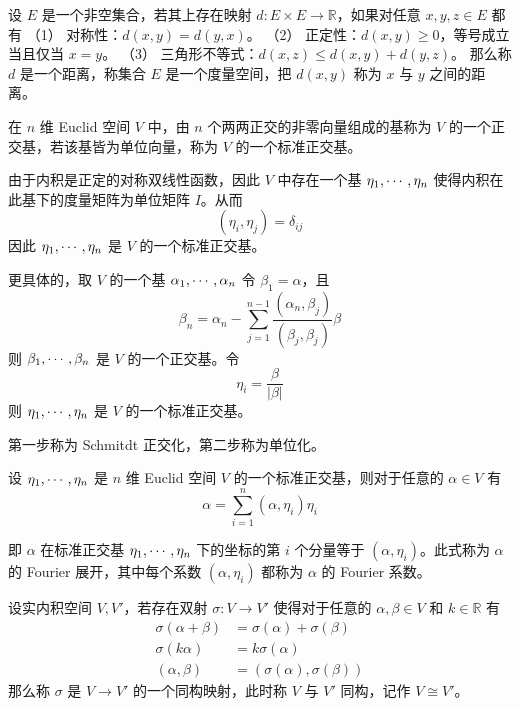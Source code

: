 \begin{definition}
	设 $E$ 是一个非空集合，若其上存在映射 $d : E \times E \to \mathbb{R}$，如果对任意 $x,y,z\in E$ 都有
	（1） 对称性：$d(x,y) = d(y,x)$。
	（2） 正定性：$d(x,y) \geqslant $0，等号成立当且仅当 $x = y$。
	（3） 三角形不等式：$d(x,z) \leqslant d(x,y) + d(y,z)$。
	那么称 $d$ 是一个距离，称集合 $E$ 是一个度量空间，把 $d(x,y)$ 称为 $x$ 与 $y$ 之间的距离。
\end{definition}

\begin{definition}
	在 $n$ 维 Euclid 空间 $V$ 中，由 $n$ 个两两正交的非零向量组成的基称为 $V$ 的一个正交基，若该基皆为单位向量，称为 $V$ 的一个标准正交基。
\end{definition}

由于内积是正定的对称双线性函数，因此 $V$ 中存在一个基 $\eta_1,\cdots,\eta_n$ 使得内积在此基下的度量矩阵为单位矩阵 $I$。从而
\[ (\eta_i,\eta_j) = \delta_{ij} \]
因此 $\eta_1,\cdots,\eta_n$ 是 $V$ 的一个标准正交基。

更具体的，取 $V$ 的一个基 $\alpha_1,\cdots,\alpha_n$ 令 $\beta_1 = \alpha$，且
\[ \beta_n = \alpha_n - \sum_{j=1}^{n-1} \frac{(\alpha_n,\beta_j)}{(\beta_j,\beta_j)} \beta \]
则 $\beta_1,\cdots,\beta_n$ 是 $V$ 的一个正交基。令
\[ \eta_i = \frac{\beta}{|\beta|} \]
则 $\eta_1,\cdots,\eta_n$ 是 $V$ 的一个标准正交基。

第一步称为 Schmitdt 正交化，第二步称为单位化。

\begin{theorem}
	设 $\eta_1,\cdots,\eta_n$ 是 $n$ 维 Euclid 空间 $V$ 的一个标准正交基，则对于任意的 $\alpha \in V$ 有
	\[ \alpha = \sum_{i=1}^n (\alpha,\eta_i)\eta_i \]
\end{theorem}

即 $\alpha$ 在标准正交基 $\eta_1,\cdots,\eta_n$ 下的坐标的第 $i$ 个分量等于 $(\alpha,\eta_i)$。此式称为 $\alpha$ 的 Fourier 展开，其中每个系数 $(\alpha,\eta_i)$ 都称为 $\alpha$ 的 Fourier 系数。

\begin{definition}
	设实内积空间 $V,V'$，若存在双射 $\sigma : V \to V'$ 使得对于任意的 $\alpha,\beta \in V$ 和 $k \in \mathbb{R}$ 有
	\begin{equation*}
		\begin{aligned}
			\sigma(\alpha + \beta) & = \sigma(\alpha) + \sigma(\beta)  \\
			\sigma(k\alpha)        & = k\sigma(\alpha)                 \\
			(\alpha,\beta)         & = (\sigma(\alpha),\sigma(\beta))
		\end{aligned}
	\end{equation*}
	那么称 $\sigma$ 是 $V \to V'$ 的一个同构映射，此时称 $V$ 与 $V'$ 同构，记作 $V \cong V'$。
\end{definition}

